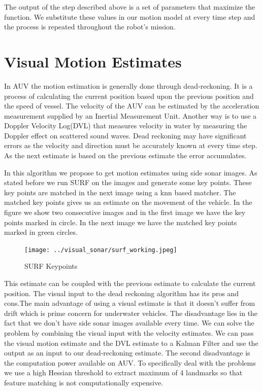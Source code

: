 \documentclass[12pt]{dalcsthesis}
\begin{document}
The output of the step described above is a set of parameters that
maximize the function. We substitute these values in our motion model
at every time step and the process is repeated throughout the robot's
mission. 
\section{Visual Motion Estimates}
In AUV the motion estimation is generally done through dead-reckoning.
It is a process of calculating the current position based upon the
previous position and the speed of vessel. The velocity of the AUV
can be estimated by the acceleration measurement supplied by an Inertial
Measurement Unit. Another way is to use a Doppler Velocity Log(DVL) that
measures velocity in water by measuring the Doppler effect on scattered
sound waves. Dead reckoning may have significant errors as the velocity
and direction must be accurately known at every time step. As the
next estimate is based on the previous estimate the error accumulates. 

In this algorithm we propose to get motion estimates using side sonar
images. As stated before we run SURF on the images and generate some
key points. These key points are matched in the next image using a
knn based matcher. The matched key points gives us an estimate on
the movement of the vehicle. In the figure we show two consecutive
images and in the first image we have the key points marked in circle.
In the next image we have the matched key points marked in green circles. 
\begin{figure}[hbtp]
\caption{SURF Keypoints}
\centering
\texttt{[image: ../visual\_sonar/surf\_working.jpeg]}
\end{figure}
This estimate can be coupled with the previous estimate to calculate
the current position. The visual input to the dead reckoning algorithm
has its pros and cons.The main advantage of using a visual estimate
is that it doesn't suffer from drift which is prime concern for underwater
vehicles. The disadvantage lies in the fact that we don't have side
sonar images available every time. We can solve the problem by combining
the visual input with the velocity estimates. We can pass the visual
motion estimate and the DVL estimate to a Kalman Filter and use the
output as an input to our dead-reckoning estimate. The second disadvantage
is the computation power available on AUV. To specifically deal with
the problems we use a high Hessian threshold to extract maximum of
4 landmarks so that feature matching is not computationally expensive. 
\end{document}

